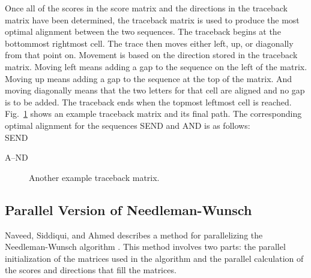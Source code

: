 \documentclass[conference]{IEEEtran}
\begin{document}
Once all of the scores in the score matrix and the directions in the traceback matrix have been determined, the traceback matrix is used to produce the most optimal alignment between the two sequences. The traceback begins at the bottommost rightmost cell. The trace then moves either left, up, or diagonally from that point on. Movement is based on the direction stored in the traceback matrix. Moving left means adding a gap to the sequence on the left of the matrix. Moving up means adding a gap to the sequence at the top of the matrix. And moving diagonally means that the two letters for that cell are aligned and no gap is to be added. The traceback ends when the topmost leftmost cell is reached. Fig.~\ref{7} shows an example traceback matrix and its final path. The corresponding optimal alignment for the sequences SEND and AND is as follows:\\
 
\quad SEND

\quad A–ND

\begin{figure}[htbp]
\centerline{}
\caption{Another example traceback matrix. \cite{vladimir}}
\label{7}
\end{figure}

\subsection{Parallel Version of Needleman-Wunsch}
Naveed, Siddiqui, and Ahmed describes a method for parallelizing the Needleman-Wunsch algorithm \cite{naveed_siddiqui_ahmed}. This method involves two parts: the parallel initialization of the matrices used in the algorithm and the parallel calculation of the scores and directions that fill the matrices.
\end{document}
